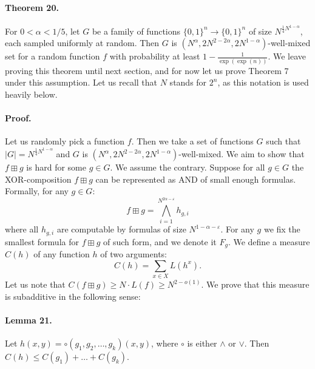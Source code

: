 \documentclass[10pt,a4paper]{article}
\begin{document}
\paragraph{Theorem 20.} For $0<\alpha<1/5$, let $G$ be a family of functions $\{0,1\}^n\to\{0,1\}^n$ of size $N^{\frac14 N^{1-\alpha}}$, each sampled uniformly at random. Then $G$ is $(N^\alpha,2N^{2-2\alpha},2N^{1-\alpha})$-well-mixed set for a random function $f$ with probability at least $1-\frac1{\exp(\exp(n))}$.
We leave proving this theorem until next section, and for now let us prove Theorem 7 under this assumption.
Let us recall that $N$ stands for $2^n$, as this notation is used heavily below.
\paragraph{Proof.} Let us randomly pick a function $f$. Then we take a set of functions $G$ such that $|G|=N^{\frac14 N^{1-\alpha}}$ and $G$ is $(N^\alpha,2N^{2-2\alpha},2N^{1-\alpha})$-well-mixed. We aim to show that $f\boxplus g$ is hard for some $g\in G$.
We assume the contrary. Suppose for all $g\in G$ the XOR-composition $f\boxplus g$ can be represented as AND of small enough formulas. Formally, for any $g\in G$:
\[f\boxplus g=\bigwedge_{i=1}^{N^{2\alpha-\varepsilon}}h_{g,i}\]
where all $h_{g,i}$ are computable by formulas of size $N^{1-\alpha-\varepsilon}$. For any $g$ we fix the smallest formula for $f\boxplus g$ of such form, and we denote it $F_g$.
We define a measure $C(h)$ of any function $h$ of two arguments:
\[C(h)=\sum_{x\in X}L(h^x).\]
Let us note that $C(f\boxplus g)\geq N\cdot L(f)\geq N^{2-o(1)}$. We prove that this measure is subadditive in the following sense:
\paragraph{Lemma 21.} Let $h(x,y)=\circ(g_1,g_2,\ldots,g_k)(x,y)$, where $\circ$ is either $\wedge$ or $\vee$. Then $C(h)\leq C(g_1)+\ldots+C(g_k)$.
\end{document}
